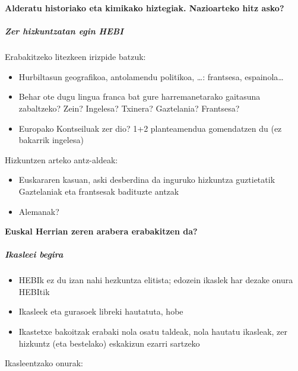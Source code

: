 \documentclass[
]{book}
\providecommand{\tightlist}{%
  \setlength{\itemsep}{0pt}\setlength{\parskip}{0pt}}
\begin{document}
\textbf{Alderatu historiako eta kimikako hiztegiak. Nazioarteko hitz asko?}

\hypertarget{zer-hizkuntzatan-egin-hebi}{%
\subparagraph{Zer hizkuntzatan egin HEBI}\label{zer-hizkuntzatan-egin-hebi}}

Erabakitzeko litezkeen irizpide batzuk:

\begin{itemize}
\tightlist
\item
  Hurbiltasun geografikoa, antolamendu politikoa, \ldots: frantsesa, espainola\ldots{}
\item
  Behar ote dugu lingua franca bat gure harremanetarako gaitasuna zabaltzeko? Zein? Ingelesa? Txinera? Gaztelania? Frantsesa?
\item
  Europako Kontseiluak zer dio? 1+2 planteamendua gomendatzen du (ez bakarrik ingelesa)
\end{itemize}

Hizkuntzen arteko antz-aldeak:

\begin{itemize}
\tightlist
\item
  Euskararen kasuan, aski desberdina da inguruko hizkuntza guztietatik
  Gaztelaniak eta frantsesak badituzte antzak
\item
  Alemanak?
\end{itemize}

\textbf{Euskal Herrian zeren arabera erabakitzen da?}

\hypertarget{ikasleei-begira}{%
\subparagraph{Ikasleei begira}\label{ikasleei-begira}}

\begin{itemize}
\tightlist
\item
  HEBIk ez du izan nahi hezkuntza elitista; edozein ikaslek har dezake onura HEBItik
\item
  Ikasleek eta gurasoek libreki hautatuta, hobe
\item
  Ikastetxe bakoitzak erabaki nola osatu taldeak, nola hautatu ikasleak, zer hizkuntz (eta bestelako) eskakizun ezarri sartzeko
\end{itemize}

Ikasleentzako onurak:
\end{document}
